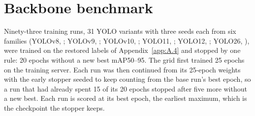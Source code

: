 \documentclass[10pt]{article}
\begin{document}
\section{Backbone benchmark}\label{app:H}
Ninety-three training runs, 31 YOLO variants with three seeds each from six families (YOLOv8, \citealp{jocher2023ultralytics}; YOLOv9, \citealp{wang2024yolov9}; YOLOv10, \citealp{wang2024yolov10}; YOLO11, \citealp{jocher2024ultralytics}; YOLO12, \citealp{tian2025yolov12}; YOLO26, \citealp{jocher2026ultralytics}), were trained on the restored labels of Appendix~\ref{app:A.4} and stopped by one rule: 20 epochs without a new best mAP50--95. The grid first trained 25 epochs on the training server. Each run was then continued from its 25-epoch weights with the early stopper seeded to keep counting from the base run's best epoch, so a run that had already spent 15 of its 20 epochs stopped after five more without a new best. Each run is scored at its best epoch, the earliest maximum, which is the checkpoint the stopper keeps.
\end{document}

